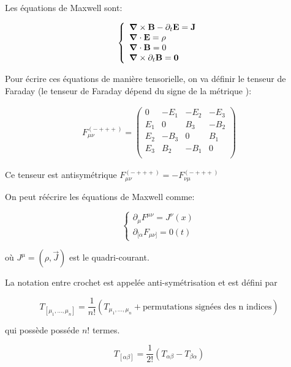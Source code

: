 Les équations de Maxwell sont:

$$\left\{
\begin{array}{l}
  \bm{\mathrm{\nabla}} \times \bm{\mathrm{B}} -\partial_{t} \bm{\mathrm{E}} = \bm{\mathrm{J}}  \\
  \bm{\mathrm{\nabla}} \cdot \bm{\mathrm{E}} = \rho\\
  \bm{\mathrm{\nabla}} \cdot \bm{\mathrm{B}} = 0\\
  \bm{\mathrm{\nabla}} \times \partial_t \bm{\mathrm{B}} = \bm{\mathrm{0}}
\end{array}
\right.$$

Pour écrire ces équations de manière tensorielle, on va définir le tenseur de Faraday (le tenseur de Faraday dépend du signe de la métrique ):


\begin{align}
\label{eq: Faraday}
 F_{\mu \nu}^{(-+++)} =  \begin{pmatrix}
0 & -E_1 & -E_2 & -E_3\\
E_1 & 0 & B_3 & -B_2\\
E_2 & -B_3 & 0 & B_1\\
E_3 & B_2 & -B_1 & 0\\
\end{pmatrix}   
\end{align}

Ce tenseur est antisymétrique $F_{\mu \nu}^{(-+++)} = - F_{\nu \mu}^{(-+++)}$

On peut réécrire les équations de Maxwell comme:

$$\left\{
\begin{array}{l}
  \partial_{\mu} F^{\mu \nu} = J^{\nu}(x) \\
  \partial_{[{\alpha}}F_{\mu \nu]} = 0(t)
\end{array}
\right.$$

où $J^{\mu} = (\rho, \Vec{J})$ est le quadri-courant.

La notation entre crochet est appelée anti-symétrisation et est défini par

\begin{equation}
    T_{[\mu_{1}, ... , \mu_{n}]} =\frac{1}{n!}(T_{\mu_{1}, ... , \mu_{n}} + \text{permutations signées des n indices})
\end{equation}

qui possède posséde $n!$ termes. 

\begin{exmp}
    \begin{equation*}
        T_{[\alpha \beta]} = \frac{1}{2!}\left(T_{\alpha\beta} - T_{ \beta \alpha}\right)
    \end{equation*}
\end{exmp}



